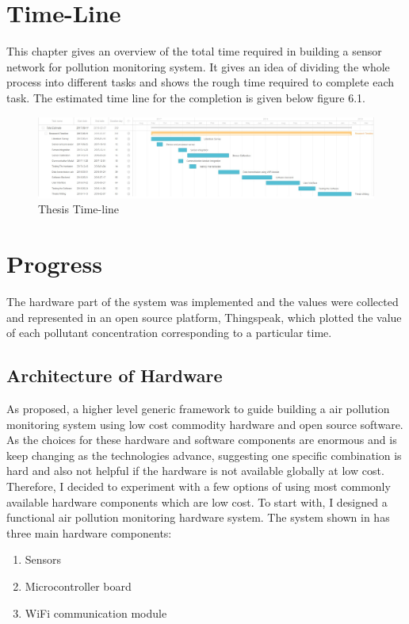 \documentclass[11pt]{article}
\begin{document}
\section{Time-Line}

This chapter gives an overview of the total time required in building a sensor network for pollution monitoring system. It gives an idea of dividing the whole process into different tasks and shows the rough time required to complete each task. The estimated time line for the completion is given below figure 6.1.



\begin{figure}[h!]
  \centering
  \hspace*{-1.25cm}   
\includegraphics[scale=0.35]{images/fig7.jpg}
  \hspace*{-1.25cm}
  \caption{Thesis Time-line}
  \label{arch}
\end{figure}

\section{Progress}

The hardware part of the system was implemented and the values were collected and represented in an open source platform, Thingspeak, which plotted the value of each pollutant concentration corresponding to a particular time.

\subsection{Architecture of Hardware}
As proposed, a higher level generic framework to guide building a air pollution monitoring system using low cost commodity hardware and open source software. As the choices for these hardware and software components are enormous and is keep changing as the technologies advance, suggesting one specific combination is hard and also not helpful if the hardware is not available globally at low cost. Therefore, I decided to experiment with a few options of using most commonly available hardware components which are low cost. To start with, I designed a functional air pollution monitoring hardware system.
The system shown in has three main hardware components:
\begin{enumerate}
\item  Sensors
\item  Microcontroller board
\item  WiFi communication module
\end{enumerate}
\end{document}
